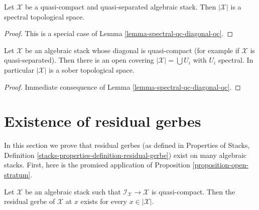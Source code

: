 \begin{lemma}
\label{lemma-spectral-qcqs}
Let $\mathcal{X}$ be a quasi-compact and quasi-separated algebraic stack.
Then $|\mathcal{X}|$ is a spectral topological space.
\end{lemma}

\begin{proof}
This is a special case of Lemma \ref{lemma-spectral-qc-diagonal-qc}.
\end{proof}

\begin{lemma}
\label{lemma-sober-qs}
Let $\mathcal{X}$ be an algebraic stack whose diagonal is quasi-compact
(for example if $\mathcal{X}$ is quasi-separated).
Then there is an open covering $|\mathcal{X}| = \bigcup U_i$
with $U_i$ spectral. In particular $|\mathcal{X}|$ is
a sober topological space.
\end{lemma}

\begin{proof}
Immediate consequence of Lemma \ref{lemma-spectral-qc-diagonal-qc}.
\end{proof}






\section{Existence of residual gerbes}
\label{section-existence-residual-gerbes}

\noindent
In this section we prove that residual gerbes (as defined in
Properties of Stacks, Definition
\ref{stacks-properties-definition-residual-gerbe})
exist on many algebraic stacks. First, here is the promised
application of
Proposition \ref{proposition-open-stratum}.

\begin{lemma}
\label{lemma-every-point-residual-gerbe}
Let $\mathcal{X}$ be an algebraic stack such that
$\mathcal{I}_\mathcal{X} \to \mathcal{X}$ is quasi-compact.
Then the residual gerbe of $\mathcal{X}$ at $x$ exists for
every $x \in |\mathcal{X}|$.
\end{lemma}


